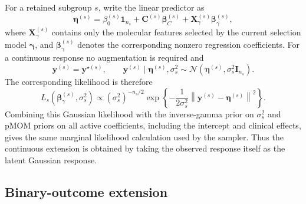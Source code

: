 \documentclass[article]{jss}
\begin{document}
For a retained subgroup $s$, write the linear predictor as
%
\begin{equation}\label{eq:eta-continuous}
  \bm{\eta}^{(s)}
  = \beta_0^{(s)}\bm{1}_{n_s}
  + \bm{C}^{(s)}\bm{\beta}_{C}^{(s)}
  + \bm{X}_{\gamma}^{(s)}\bm{\beta}_{\gamma}^{(s)},
\end{equation}
%
where $\bm{X}_{\gamma}^{(s)}$ contains only the molecular features selected by
the current selection model $\bm{\gamma}$, and
$\bm{\beta}_{\gamma}^{(s)}$ denotes the corresponding nonzero regression
coefficients.  For a continuous response no augmentation is required and
%
\begin{equation}\label{eq:continuous-model}
  \bm{y}^{(s)}=\bm{y}^{\star(s)}, \qquad
  \bm{y}^{(s)}\mid\bm{\eta}^{(s)},\sigma_s^2
  \sim \mathcal{N}\!\left(\bm{\eta}^{(s)},\sigma_s^2\bm{I}_{n_s}\right).
\end{equation}
%
The corresponding likelihood is therefore
%
\begin{equation}\label{eq:continuous-likelihood}
  L_s(\bm{\beta}_{\gamma}^{(s)},\sigma_s^2)
  \propto (\sigma_s^2)^{-n_s/2}
  \exp\!\left\{
    -\frac{1}{2\sigma_s^2}
    \left\|\bm{y}^{(s)}-\bm{\eta}^{(s)}\right\|^2
  \right\}.
\end{equation}
%
Combining this Gaussian likelihood with the inverse-gamma prior on
$\sigma_s^2$ and pMOM priors on all active coefficients, including the
intercept and clinical effects, gives the same marginal
likelihood calculation used by the sampler.  Thus the continuous extension is
obtained by taking the observed response itself as the latent Gaussian
response.

\clearpage
\subsection{Binary-outcome extension}\label{sec:appendix-binary}
\end{document}

